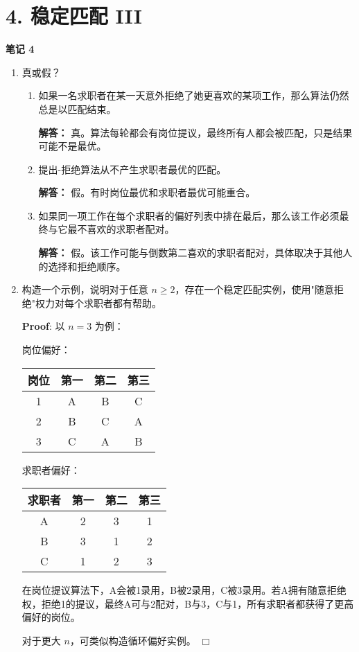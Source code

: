\documentclass[11pt]{article}
\newenvironment{qparts}{\begin{enumerate}[{(}a{)}]}{\end{enumerate}}
\def\endproofmark{$\Box$}
\newenvironment{proof}{\par{\bf Proof}:}{\endproofmark\smallskip}
\begin{document}
\section*{4. 稳定匹配 III}
\textbf{笔记 4}
\begin{qparts}
\item 真或假？
\begin{enumerate}[{(}i{)}]
\item 如果一名求职者在某一天意外拒绝了她更喜欢的某项工作，那么算法仍然总是以匹配结束。

\textbf{解答：} 真。算法每轮都会有岗位提议，最终所有人都会被匹配，只是结果可能不是最优。

\item 提出-拒绝算法从不产生求职者最优的匹配。

\textbf{解答：} 假。有时岗位最优和求职者最优可能重合。

\item 如果同一项工作在每个求职者的偏好列表中排在最后，那么该工作必须最终与它最不喜欢的求职者配对。

\textbf{解答：} 假。该工作可能与倒数第二喜欢的求职者配对，具体取决于其他人的选择和拒绝顺序。
\end{enumerate}

\item 构造一个示例，说明对于任意 $n \geq 2$，存在一个稳定匹配实例，使用"随意拒绝"权力对每个求职者都有帮助。

\begin{proof}
以 $n=3$ 为例：

岗位偏好：
\begin{tabular}{c|ccc}
岗位 & 第一 & 第二 & 第三 \\
\hline
1 & A & B & C \\
2 & B & C & A \\
3 & C & A & B \\
\end{tabular}

求职者偏好：
\begin{tabular}{c|ccc}
求职者 & 第一 & 第二 & 第三 \\
\hline
A & 2 & 3 & 1 \\
B & 3 & 1 & 2 \\
C & 1 & 2 & 3 \\
\end{tabular}

在岗位提议算法下，A会被1录用，B被2录用，C被3录用。若A拥有随意拒绝权，拒绝1的提议，最终A可与2配对，B与3，C与1，所有求职者都获得了更高偏好的岗位。

对于更大 $n$，可类似构造循环偏好实例。
\end{proof}
\end{qparts}
\end{document}
